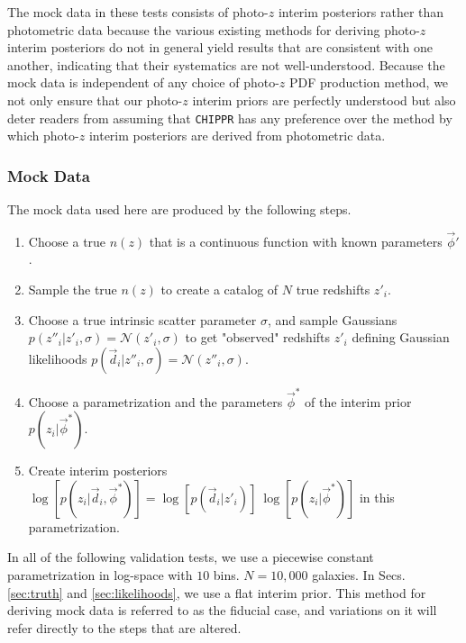 \documentclass[iop]{emulateapj}
\newcommand{\chippr}{\texttt{CHIPPR} }
\begin{document}
The mock data in these tests consists of photo-$z$ interim posteriors rather 
than photometric data because the various existing methods for deriving 
photo-$z$ interim posteriors do not in general yield results that are 
consistent with one another, indicating that their systematics are not 
well-understood.  Because the mock data is independent of any choice of 
photo-$z$ PDF production method, we not only ensure that our photo-$z$ interim 
priors are perfectly understood but also deter readers from assuming that 
\chippr has any preference over the method by which photo-$z$ interim 
posteriors are derived from photometric data.

\subsubsection{Mock Data}
\label{sec:mockdata}

The mock data used here are produced by the following steps.

\begin{enumerate}
	\item \label{itm:true} Choose a true $n(z)$ that is a continuous 
function with known parameters $\vec{\phi}'$.
	\item \label{itm:sample} Sample the true $n(z)$ to create a catalog of 
$N$ true redshifts $z'_{i}$.
	\item \label{itm:scatter} Choose a true intrinsic scatter parameter 
$\sigma$, and sample Gaussians $p(z''_{i} | z'_{i}, \sigma) = 
\mathcal{N}(z'_{i}, \sigma)$ to get "observed" redshifts $z'_{i}$ defining 
Gaussian likelihoods $p(\vec{d}_{i} | z''_{i}, \sigma) = \mathcal{N}(z''_{i}, 
\sigma)$.
	\item \label{itm:interim} Choose a parametrization and the parameters 
$\vec{\phi}^{*}$ of the interim prior $p(z_{i} | \vec{\phi}^{*})$.
	\item \label{itm:posterior} Create interim posteriors $\log[p(z_{i} | 
\vec{d}_{i}, \vec{\phi}^{*})] = \log[p(\vec{d}_{i} | z'_{i})]\ \log[p(z_{i} | 
\vec{\phi}^{*})]$ in this parametrization.
\end{enumerate}

In all of the following validation tests, we use a piecewise constant 
parametrization in log-space with $10$ bins.  $N = 10,000$ galaxies.  In Secs. 
\ref{sec:truth} and \ref{sec:likelihoods}, we use a flat interim prior.  This 
method for deriving mock data is referred to as the fiducial case, and 
variations on it will refer directly to the steps that are altered.
\end{document}
